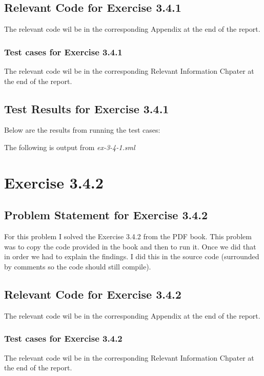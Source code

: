 \documentclass{report}
\begin{document}
\section{Relevant Code for Exercise 3.4.1}
\label{sec:relevant-code-ex-3-4-1}
  The relevant code wil be in the corresponding Appendix at the
  end of the report.

\subsection{Test cases for Exercise 3.4.1}
\label{sec:test-cases-ex-3-4-1}
The relevant code wil be in the corresponding Relevant Information 
Chpater at the end of the report.

\section{Test Results for Exercise 3.4.1}
\label{sec:tests-ex-3-4-1}

Below are the results from running the test cases:

The following is output from \emph{ex-3-4-1.sml}


\chapter{Exercise 3.4.2}
\label{cha:exercise-3-4-2}

\section{Problem Statement for Exercise 3.4.2}
\label{sec:problem-statement-ex-3-4-2}
  For this problem I solved the Exercise 3.4.2 from the PDF book.
  This problem was to copy the code provided in the book and then
  to run it. Once we did that in order we had to explain the findings.
  I did this in the source code (surrounded by comments so the code
  should still compile).

\section{Relevant Code for Exercise 3.4.2}
\label{sec:relevant-code-ex-3-4-2}
  The relevant code wil be in the corresponding Appendix at the
  end of the report.

\subsection{Test cases for Exercise 3.4.2}
\label{sec:test-cases-ex-3-4-2}
  The relevant code wil be in the corresponding Relevant Information 
  Chpater at the end of the report.
\end{document}
